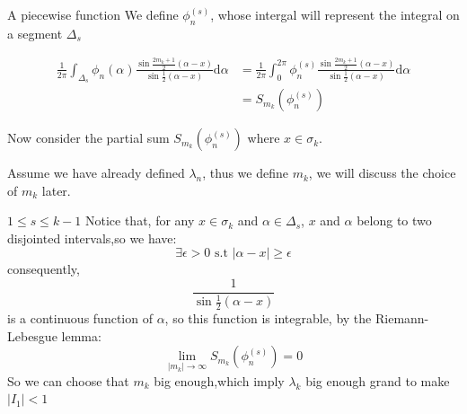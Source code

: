 \documentclass{beamer}
\begin{document}
\begin{frame}{A piecewise function}
    We define  $ \phi_n^{(s)} $, whose intergal will represent the integral on a segment $ \Delta_s $
    \begin{block}{}
        \begin{align*}
            \frac{1}{2\pi}\int_{\Delta_s}\phi_n(\alpha)\frac{\sin\frac{2m_k+1}{2}(\alpha-x)}{\sin\frac{1}{2}(\alpha-x)}\mathrm{d}\alpha 
            &=\frac{1}{2\pi}\int_{0}^{2\pi}\phi_n^{(s)}\frac{\sin\frac{2m_k+1}{2}(\alpha-x)}{\sin\frac{1}{2}(\alpha-x)}\mathrm{d}\alpha\\
            &= S_{m_k}(\phi_n^{(s)})
        \end{align*}
    \end{block}
    Now consider the partial sum $ S_{m_k}(\phi_n^{(s)}) $ where $ x \in \sigma_k $.\par
    Assume we have already defined $ \lambda_n $, thus we define $ m_k $, we will discuss the choice of $ m_k $ later.\par 

\end{frame}

\begin{frame}{$ 1 \leqslant s \leqslant k-1 $}
        Notice that, for any $ x \in \sigma_k $ and $ \alpha \in \Delta_s $, $ x $ and $ \alpha $ belong to two disjointed intervals,so we have:
\[ \exists \epsilon >0 \text{ s.t } |\alpha-x|\geqslant \epsilon \]
    consequently, \[ \frac{1}{\sin\frac{1}{2}(\alpha-x)} \] is a continuous function of $ \alpha  $, so this function is integrable, by the Riemann-Lebesgue lemma:
\[\lim_{|m_k|\rightarrow \infty}S_{m_k}(\phi_n^{(s)}) = 0 \] 
So we can choose that $ m_k $ big enough,which imply $ \lambda_k $ big enough grand to make $ |I_1|<1 $



\end{frame}
\end{document}
